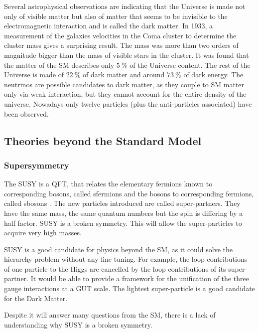       Several astrophysical observations are indicating that the Universe is made not only of visible matter but also of matter that seems to be invisible to the electromagnetic interaction and is called the dark matter.
      In 1933, a measurement of the galaxies velocities in the Coma cluster to determine the cluster mass gives a surprising result.
      The mass was more than two orders of magnitude bigger than the mass of visible stars in the cluster.
      It was found that the matter of the \gls{SM} describes only $5~\%$ of the Universe content. 
      The rest of the Universe is made of $22~\%$ of dark matter and around $73~\%$ of dark energy.
      The neutrinos are possible candidates to dark matter, as they couple to \gls{SM} matter only via weak interaction, but they cannot account for the entire density of the universe.
      Nowadays only twelve particles (plus the anti-particles associated) have been observed. 

    \subsection{Theories beyond the Standard Model}

      \subsubsection{Supersymmetry}
    
      The \gls{SUSY} is a \gls{QFT}, that relates the elementary fermions known to corresponding bosons, called sfermions and the bosons to corresponding fermions, called sbosons \cite{Signer2009}.
      The new particles introduced are called super-partners.
      They have the same mass, the same quantum numbers but the spin is differing by a half factor.
      \gls{SUSY} is a broken symmetry. 
      This will allow the super-particles to acquire very high masses.

      \gls{SUSY} is a good candidate for physics beyond the \gls{SM}, as it could solve the hierarchy problem without any fine tuning.
      For example, the loop contributions of one particle to the Higgs are cancelled by the loop contributions of its super-partner.
      It would be able to provide a framework for the unification of the three gauge interactions at a GUT scale.
      The lightest super-particle is a good candidate for the Dark Matter.

      Despite it will answer many questions from the \gls{SM}, there is a lack of understanding why \gls{SUSY} is a broken symmetry.
      
